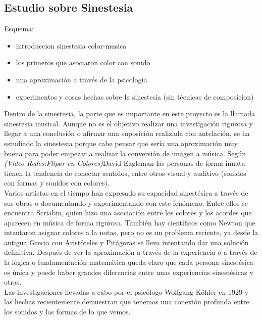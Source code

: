 \subsection{Estudio sobre Sinestesia}
\label{subsubsec:estudioSinestesia}

Esquema:
\begin{itemize}
\item introduccion sinestesia color-musica
\item los primeros que asociaron color con sonido
\item una aproximación a través de la psicologia
\item experimentos y cosas hechas sobre la sinestesia (sin técnicas de composicion)
\end{itemize}

Dentro de la sinestesia, la parte que es importante en este proyecto es la llamada sinestesia musical. Aunque no es el objetivo realizar una investigación rigurosa y llegar a una conclusión o afirmar una suposición realizada con antelación, se ha estudiado la sinestesia porque cabe pensar que sería una aproximación muy buena para poder empezar a realizar la conversión de imagen a música.
Según \emph{(Video Redes:Flipar en Colores)}David Eagleman las personas de forma innata tienen la tendencia de conectar sentidos, entre otros visual y auditivo (sonidos con formas y sonidos con colores).\\

Varios artistas en el tiempo han expresado su capacidad sinestésica a través de sus obras o documentando y experimentando con este fenómeno. Entre ellos se encuentra Scriabin, quien hizo una asociación entre los colores y los acordes que aparecen en música de forma rigurosa. También hay científicos como Newton que intentaron asignar colores a la notas, pero no es un problema reciente, ya desde la antigua Grecia con Aristóteles y Pitágoras se lleva intentando dar una solución definitiva. Después de ver la aproximación a través de la experiencia o a través de la lógica o fundamentación matemática queda claro que cada persona sinestésica es única y puede haber grandes diferencias entre unas experiencias sinestésicas y otras.\\

Las investigaciones llevadas a cabo por el psicólogo Wolfgang Köhler en 1929 y las hechas recientemente demuestran que tenemos una conexión profunda entre los sonidos y las formas de lo que vemos. 


